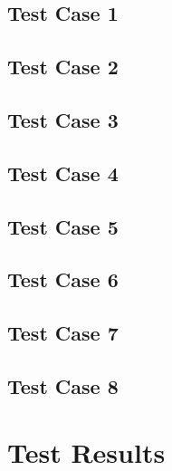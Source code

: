 \documentclass[11pt]{article}
\begin{document}
\subsection{Test Case 1}
\subsection{Test Case 2}
\subsection{Test Case 3}
\subsection{Test Case 4}
\subsection{Test Case 5}
\subsection{Test Case 6}
\subsection{Test Case 7}
\subsection{Test Case 8}

\section{Test Results}%
\end{document}
